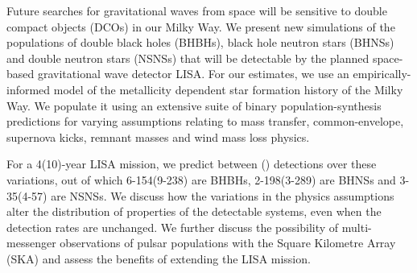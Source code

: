Future searches for gravitational waves from space will be sensitive to double compact objects (DCOs) in our Milky Way. We present new simulations of the populations of double black holes (BHBHs), black hole neutron stars (BHNSs) and double neutron stars (NSNSs) that will be detectable by the planned space-based gravitational wave detector LISA. 
%
For our estimates, we use an empirically-informed model of the metallicity dependent star formation history of the Milky Way. We populate it using an extensive suite of binary population-synthesis predictions for varying assumptions relating to mass transfer, common-envelope, supernova kicks, remnant masses and wind mass loss physics. 

For a 4(10)-year LISA mission, we predict between \rangeFourYear{}(\rangeTenYear{}) detections over these variations, out of which 6-154(9-238) are BHBHs, 2-198(3-289) are BHNSs and 3-35(4-57) are NSNSs.
%
 We discuss how the variations in the physics assumptions alter the distribution of properties of the detectable systems, even when the detection rates are unchanged. We further discuss the possibility of multi-messenger observations of pulsar populations with the Square Kilometre Array (SKA) and assess the benefits of extending the LISA mission. 

